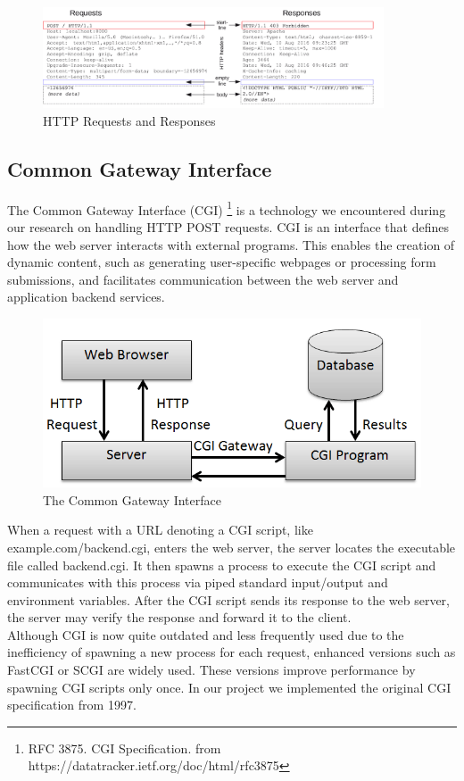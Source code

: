 \begin{figure}[h]
	\centering
	\includegraphics[width=0.9\textwidth]{figures/http_structure.png}
	\caption{HTTP Requests and Responses}
\end{figure}

\subsection*{Common Gateway Interface}
The Common Gateway Interface (CGI) \footnote{RFC 3875. CGI Specification. from https://datatracker.ietf.org/doc/html/rfc3875} is a technology we encountered during our research on handling HTTP POST requests. CGI is an interface that defines how the web server interacts with external programs. This enables the creation of dynamic content, such as generating user-specific webpages or processing form submissions, and facilitates communication between the web server and application backend services.

\begin{figure}[h]
	\centering
	\includegraphics[width=\textwidth]{figures/Common-Gateway-Interface.png}
	\caption{The Common Gateway Interface}
\end{figure}

When a request with a URL denoting a CGI script, like example.com/backend.cgi, enters the web server, the server locates the executable file called backend.cgi. It then spawns a process to execute the CGI script and communicates with this process via piped standard input/output and environment variables. After the CGI script sends its response to the web server, the server may verify the response and forward it to the client.\\

Although CGI is now quite outdated and less frequently used due to the inefficiency of spawning a new process for each request, enhanced versions such as FastCGI or SCGI are widely used. These versions improve performance by spawning CGI scripts only once. In our project we implemented the original CGI specification from 1997.


